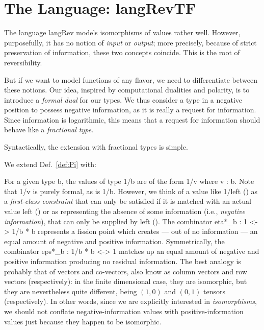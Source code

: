 \documentclass{llncs}
\begin{document}
\section{The Language: {{langRevTF}} }

The language {{langRev}} models isomorphisms of values rather well.  However,
purposefully, it has no notion of \emph{input} or \emph{output}; more
precisely, because of strict preservation of information, these two concepts
coincide.  This is the root of reversibility.

But if we want to model functions of any flavor, we need to differentiate
between these notions.  Our idea, inspired by computational dualities and
polarity, is to introduce a \emph{formal dual} for our types.  We thus
consider a type in a negative position to possess negative information, as it
is really a request for information.  Since information is logarithmic, this
means that a request for information should behave like a \emph{fractional
  type}.

Syntactically, the extension with fractional types is simple. 

\begin{definition}
\label{def:langRevT}
We extend Def.~\ref{def:Pi} with:
%
\end{definition}

For a given type {{b}}, the values of type {{1/b}} are of the form {{1/v}}
where {{v : b}}. Note that {{1/v}} is purely formal, as is {{1/b}}.  However,
we think of a value like {{1/left ()}} as a \emph{first-class constraint}
that can only be satisfied if it is matched with an actual value {{left ()}}
or as representing the absence of some information (i.e., \emph{negative
  information}), that can only be supplied by {{left ()}}. The combinator
{{eta*_b : 1 <-> 1/b * b}} represents a fission point which creates --- out
of no information --- an equal amount of negative and positive
information. Symmetrically, the combinator {{eps*_b : 1/b * b <-> 1}} matches
up an equal amount of negative and positive information producing no residual
information.  The best analogy is probably that of vectors and co-vectors,
also know as column vectors and row vectors (respectively): in the finite
dimensional case, they are isomorphic, but they are nevertheless quite
different, being $(1,0)$ and $(0,1)$ tensors (respectively).  In other words,
since we are explicitly interested in \emph{isomorphisms}, we should not
conflate negative-information values with positive-information values just
because they happen to be isomorphic.
\end{document}
